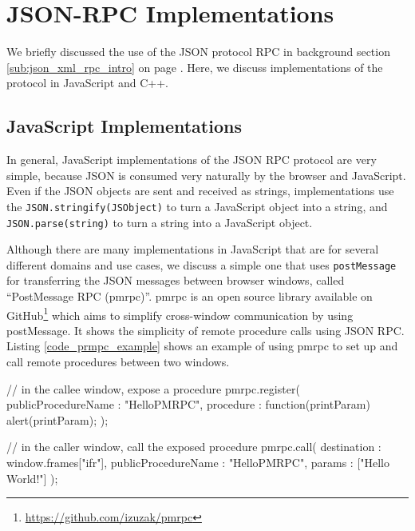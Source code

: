 


\section{JSON-RPC Implementations} %
We briefly discussed the use of the JSON protocol RPC in background section \ref{sub:json_xml_rpc_intro} on page \pageref{sub:json_xml_rpc_intro}. Here, we discuss implementations of the protocol in JavaScript and C++.
\label{sec:json_rpc_implementations}


\subsection{JavaScript Implementations} %
\label{sub:pmrpc_json_rpc_using_postmessage}

In general, JavaScript implementations of the JSON RPC protocol are very simple, because JSON is consumed very naturally by the browser and JavaScript. Even if the JSON objects are sent and received as strings, implementations use the \lstinline{JSON.stringify(JSObject)} to turn a JavaScript object into a string, and \lstinline{JSON.parse(string)} to turn a string into a JavaScript object.

Although there are many implementations in JavaScript that are for several different domains and use cases, we discuss a simple one that uses \lstinline{postMessage} for transferring the JSON messages between browser windows, called ``PostMessage RPC (pmrpc)''. pmrpc is an open source library available on GitHub\footnote{\url{https://github.com/izuzak/pmrpc}} which aims to simplify cross-window communication by using postMessage. It shows the simplicity of remote procedure calls using JSON RPC. Listing \ref{code_prmpc_example} shows an example of using pmrpc to set up and call remote procedures between two windows.

\begin{code}
// in the callee window, expose a procedure
pmrpc.register({
  publicProcedureName : "HelloPMRPC",
  procedure : function(printParam) { alert(printParam); } 
});

// in the caller window, call the exposed procedure
pmrpc.call({
  destination : window.frames["ifr"],
  publicProcedureName : "HelloPMRPC",
  params : ["Hello World!"]
});
\end{code}

